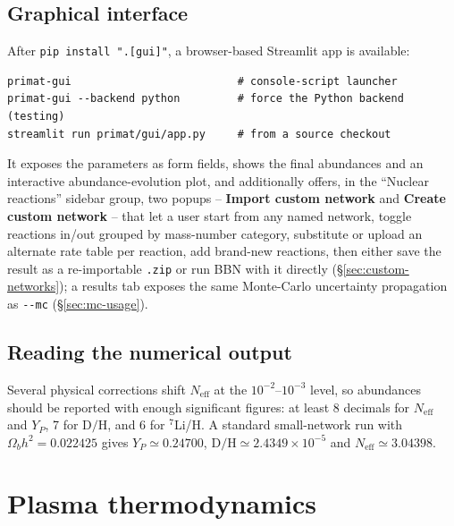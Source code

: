 \documentclass[11pt,a4paper]{article}
\newcommand{\Neff}{N_{\mathrm{eff}}}
\newcommand{\YP}{Y_P}
\newcommand{\DoH}{\mathrm{D/H}}
\newcommand{\code}[1]{\texttt{#1}}
\begin{document}
\subsection{Graphical interface}
After \code{pip install ".[gui]"}, a browser-based Streamlit app is available:
\begin{lstlisting}[style=sh]
primat-gui                          # console-script launcher
primat-gui --backend python         # force the Python backend (testing)
streamlit run primat/gui/app.py     # from a source checkout
\end{lstlisting}
It exposes the parameters as form fields, shows the final abundances and an
interactive abundance-evolution plot, and additionally offers, in the
``Nuclear reactions'' sidebar group, two popups -- \textbf{Import custom
network} and \textbf{Create custom network} -- that let a user start from any
named network, toggle reactions in/out grouped by mass-number category,
substitute or upload an alternate rate table per reaction, add brand-new
reactions, then either save the result as a re-importable \code{.zip} or run
BBN with it directly (\S\ref{sec:custom-networks}); a results tab exposes the
same Monte-Carlo uncertainty propagation as \code{-{}-mc}
(\S\ref{sec:mc-usage}).

\subsection{Reading the numerical output}
Several physical corrections shift $\Neff$ at the $10^{-2}$--$10^{-3}$ level, so
abundances should be reported with enough significant figures: at least 8
decimals for $\Neff$ and $\YP$, 7 for $\DoH$, and 6 for $^{7}$Li/H. A standard
small-network run with $\Omega_b h^2 = 0.022425$ gives $\YP \simeq 0.24700$,
$\DoH \simeq 2.4349\times10^{-5}$ and $\Neff \simeq 3.04398$.

\section{Plasma thermodynamics}\label{sec:plasma}
\end{document}

